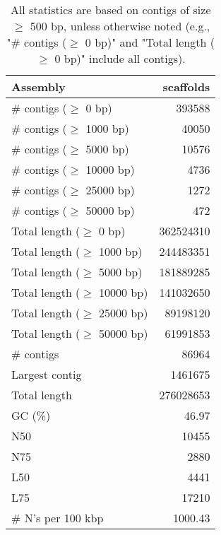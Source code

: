 \documentclass[12pt,a4paper]{article}
\begin{document}
\begin{table}[ht]
\begin{center}
\caption{All statistics are based on contigs of size $\geq$ 500 bp, unless otherwise noted (e.g., "\# contigs ($\geq$ 0 bp)" and "Total length ($\geq$ 0 bp)" include all contigs).}
\begin{tabular}{|l*{1}{|r}|}
\hline
Assembly & scaffolds \\ \hline
\# contigs ($\geq$ 0 bp) & 393588 \\ \hline
\# contigs ($\geq$ 1000 bp) & 40050 \\ \hline
\# contigs ($\geq$ 5000 bp) & 10576 \\ \hline
\# contigs ($\geq$ 10000 bp) & 4736 \\ \hline
\# contigs ($\geq$ 25000 bp) & 1272 \\ \hline
\# contigs ($\geq$ 50000 bp) & 472 \\ \hline
Total length ($\geq$ 0 bp) & 362524310 \\ \hline
Total length ($\geq$ 1000 bp) & 244483351 \\ \hline
Total length ($\geq$ 5000 bp) & 181889285 \\ \hline
Total length ($\geq$ 10000 bp) & 141032650 \\ \hline
Total length ($\geq$ 25000 bp) & 89198120 \\ \hline
Total length ($\geq$ 50000 bp) & 61991853 \\ \hline
\# contigs & 86964 \\ \hline
Largest contig & 1461675 \\ \hline
Total length & 276028653 \\ \hline
GC (\%) & 46.97 \\ \hline
N50 & 10455 \\ \hline
N75 & 2880 \\ \hline
L50 & 4441 \\ \hline
L75 & 17210 \\ \hline
\# N's per 100 kbp & 1000.43 \\ \hline
\end{tabular}
\end{center}
\end{table}
\end{document}
